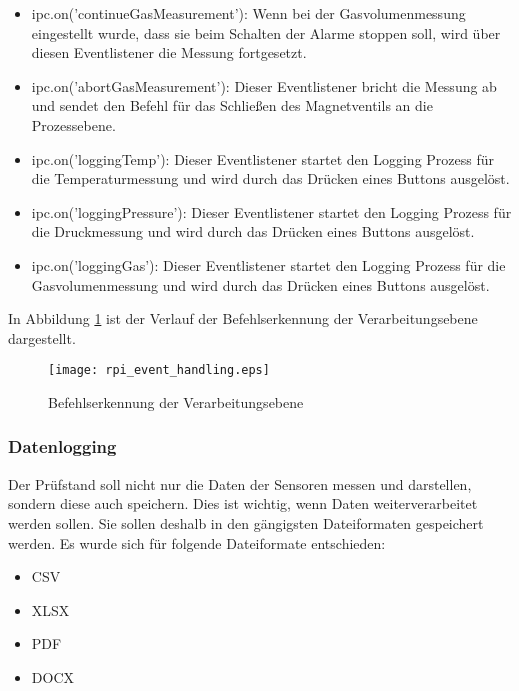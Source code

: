 \begin{itemize}
 \item ipc.on('continueGasMeasurement'): Wenn bei der Gasvolumenmessung eingestellt wurde, dass sie beim Schalten der Alarme stoppen soll, wird über diesen Eventlistener die Messung fortgesetzt.
 
 \item ipc.on('abortGasMeasurement'): Dieser Eventlistener bricht die Messung ab und sendet den Befehl für das Schließen des Magnetventils an die Prozessebene.
 
 \item ipc.on('loggingTemp'): Dieser Eventlistener startet den Logging Prozess für die Temperaturmessung und wird durch das Drücken eines Buttons ausgelöst.
 
 \item ipc.on('loggingPressure'): Dieser Eventlistener startet den Logging Prozess für die Druckmessung und wird durch das Drücken eines Buttons ausgelöst.
 
 \item ipc.on('loggingGas'): Dieser Eventlistener startet den Logging Prozess für die Gasvolumenmessung und wird durch das Drücken eines Buttons ausgelöst.
 
\end{itemize}

\noindent
In Abbildung \ref{rpi_event_handling} ist der Verlauf der Befehlserkennung der Verarbeitungsebene dargestellt.
\begin{figure}[h]
\centering
\texttt{[image: rpi\_event\_handling.eps]}
\caption{Befehlserkennung der Verarbeitungsebene}
\label{rpi_event_handling}
\end{figure}

\subsubsection{Datenlogging}
Der Prüfstand soll nicht nur die Daten der Sensoren messen und darstellen, sondern diese auch speichern. Dies ist wichtig, wenn Daten weiterverarbeitet werden sollen. Sie sollen deshalb in den gängigsten Dateiformaten gespeichert werden. Es wurde sich für folgende Dateiformate entschieden:
\begin{itemize}
\itemsep0em
	\item CSV
	\item XLSX
	\item PDF
	\item DOCX
\end{itemize}

